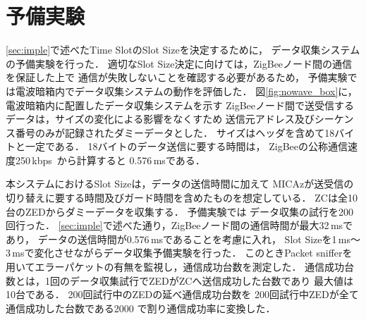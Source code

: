 \documentclass[12pt]{jreport}
\begin{document}

\section{予備実験}
\label{ssec:before_exp}

\ref{sec:imple}で述べたTime SlotのSlot Sizeを決定するために，
データ収集システムの予備実験を行った．
適切なSlot Size決定に向けては，ZigBeeノード間の通信を保証した上で
通信が失敗しないことを確認する必要があるため，
予備実験では電波暗箱内でデータ収集システムの動作を評価した．
図\ref{fig:nowave_box}に，電波暗箱内に配置したデータ収集システムを示す
ZigBeeノード間で送受信するデータは，サイズの変化による影響をなくすため
送信元アドレス及びシーケンス番号のみが記録されたダミーデータとした．
サイズはヘッダを含めて18バイトと一定である．
18バイトのデータ送信に要する時間は，
ZigBeeの公称通信速度250\,kbps~\cite{IEEE802_15_4-2006}から計算すると
0.576\,msである．

本システムにおけるSlot Sizeは，データの送信時間に加えて
MICAzが送受信の切り替えに要する時間及びガード時間を含めたものを想定している．
ZCは全10台のZEDからダミーデータを収集する．
予備実験では
データ収集の試行を200回行った．
\ref{sec:imple}で述べた通り，ZigBeeノード間の通信時間が最大32\,msであり，
データの送信時間が0.576\,msであることを考慮に入れ，
Slot Sizeを1\,ms〜3\,msで変化させながらデータ収集予備実験を行った．
このときPacket snifferを用いてエラーパケットの有無を監視し，通信成功台数を測定した．
通信成功台数とは，1回のデータ収集試行でZEDがZCへ送信成功した台数であり
最大値は10台である．
200回試行中のZEDの延べ通信成功台数を
200回試行中ZEDが全て通信成功した台数である2000
で割り通信成功率に変換した．
\end{document}
